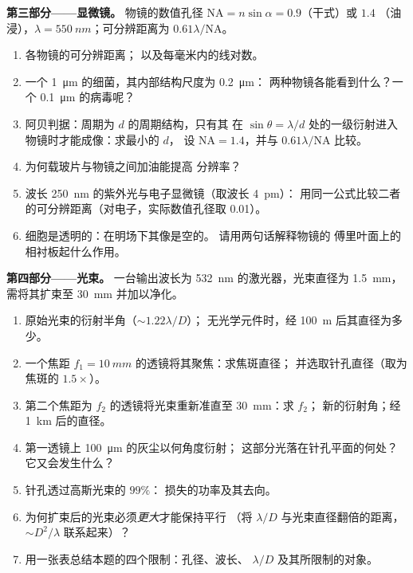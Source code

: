 \begin{problem}
\medskip
\noindent\textbf{第三部分——显微镜。}
物镜的数值孔径 $\mathrm{NA} = n\sin\alpha = 0.9$（干式）或 $1.4$
（油浸），$\lambda = \qty{550}{nm}$；可分辨距离为 $0.61\lambda/\mathrm{NA}$。
\begin{enumerate}[resume]
  \item 各物镜的可分辨距离；
        以及每毫米内的线对数。
  \item 一个 \qty{1}{\micro m} 的细菌，其内部结构尺度为 \qty{0.2}{\micro m}：
        两种物镜各能看到什么？一个 \qty{0.1}{\micro m} 的病毒呢？
  \item 阿贝判据：周期为 $d$ 的周期结构，只有其
        在 $\sin\theta = \lambda/d$ 处的一级衍射进入物镜时才能成像：求最小的 $d$，
        设 $\mathrm{NA} = 1.4$，并与 $0.61\lambda/\mathrm{NA}$ 比较。
  \item 为何载玻片与物镜之间加油能提高
        分辨率？
  \item 波长 \qty{250}{nm} 的紫外光与电子显微镜（取波长 \qty{4}{pm}）：
        用同一公式比较二者的可分辨距离（对电子，实际数值孔径取
        \qty{0.01}{}）。
  \item 细胞是透明的：在明场下其像是空的。
        请用两句话解释物镜的
        傅里叶面上的相衬板起什么作用。
\end{enumerate}

\medskip
\noindent\textbf{第四部分——光束。}
一台输出波长为 \qty{532}{nm} 的激光器，光束直径为 \qty{1.5}{mm}，
需将其扩束至 \qty{30}{mm} 并加以净化。
\begin{enumerate}[resume]
  \item 原始光束的衍射半角（$\sim1.22\lambda/D$）；
        无光学元件时，经 \qty{100}{m} 后其直径为多少。
  \item 一个焦距 $f_1 = \qty{10}{mm}$ 的透镜将其聚焦：求焦斑直径；
        并选取针孔直径（取为焦斑的 $1.5\times$）。
  \item 第二个焦距为 $f_2$ 的透镜将光束重新准直至 \qty{30}{mm}：求 $f_2$；
        新的衍射角；经 \qty{1}{km} 后的直径。
  \item 第一透镜上 \qty{100}{\micro m} 的灰尘以何角度衍射；
        这部分光落在针孔平面的何处？
        它又会发生什么？
  \item 针孔透过高斯光束的 $99\%$：
        损失的功率及其去向。
  \item 为何扩束后的光束必须\emph{更大}才能保持平行
        （将 $\lambda/D$ 与光束直径翻倍的距离，
        $\sim D^2/\lambda$ 联系起来）？
  \item 用一张表总结本题的四个限制：孔径、波长、
        $\lambda/D$ 及其所限制的对象。
\end{enumerate}
\end{problem}
